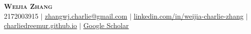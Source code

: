 \begin{center}
    \textbf{\Huge \scshape Weijia Zhang} \\ \vspace{1pt}
    \small 2172003915 $|$ \href{mailto:zhangwj.charlie@gmail.com}{zhangwj.charlie@gmail.com} $|$
    \href{https://www.linkedin.com/in/weijia-charlie-zhang/}{\underline{linkedin.com/in/weijia-charlie-zhang}} $|$
    \href{https://charliedreemur.github.io}{\underline{charliedreemur.github.io}} $|$
    \href{https://scholar.google.com/citations?user=JN57tLsAAAAJ&hl=en}{\underline{Google Scholar}}
\end{center}
